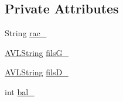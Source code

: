 \subsection*{Private Attributes}
\begin{DoxyCompactItemize}
\item 
String \hyperlink{class_a_v_l_string_adb167b91de2f634545354179d75c7a2a}{rac\-\_\-}
\item 
\hyperlink{class_a_v_l_string}{A\-V\-L\-String} \hyperlink{class_a_v_l_string_ad79e01875b56754629c8e0c928fcf530}{fils\-G\-\_\-}
\item 
\hyperlink{class_a_v_l_string}{A\-V\-L\-String} \hyperlink{class_a_v_l_string_a683f6fd78271d50b935b0255ffc7441a}{fils\-D\-\_\-}
\item 
int \hyperlink{class_a_v_l_string_a5a492e5ae84bdf492f68e1f41e918734}{bal\-\_\-}
\end{DoxyCompactItemize}


